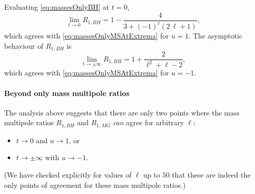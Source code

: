 \documentclass[12pt,a4paper]{article}
\begin{document}
Evaluating \eqref{eq:massesOnlyBH} at $t=0$,
\begin{equation}
\lim\limits_{t\rightarrow 0}R_{1,BH}=1-\frac{4}{3+(-1)^\ell(2\,\ell+1)},
\end{equation}
which agrees with \eqref{eq:massesOnlyMSAtExtrema} for $u=1$. The asymptotic behaviour of $R_{1,BH}$ is
\begin{equation}
\lim\limits_{t\rightarrow\pm\infty}R_{1,BH}=1+\frac{2}{\ell^2+\ell-2},\label{eq:R1BHtinf}
\end{equation}
which agrees with \eqref{eq:massesOnlyMSAtExtrema} for $u=-1$.


\paragraph{Beyond only mass multipole ratios}
The analysis above suggests that there are only two points where the mass multipole ratios $R_{1,BH}$ and $R_{1,MG}$ \emph{can} agree for arbitrary $\ell$:
\begin{itemize}
 \item $t\rightarrow0$ and $u\rightarrow1$, or
 \item $t\rightarrow\pm\infty$ with $u\rightarrow-1$.
\end{itemize}
(We have checked explicitly for values of $\ell$ up to $50$ that these are indeed the only points of agreement for these mass multipole ratios.)
\end{document}
